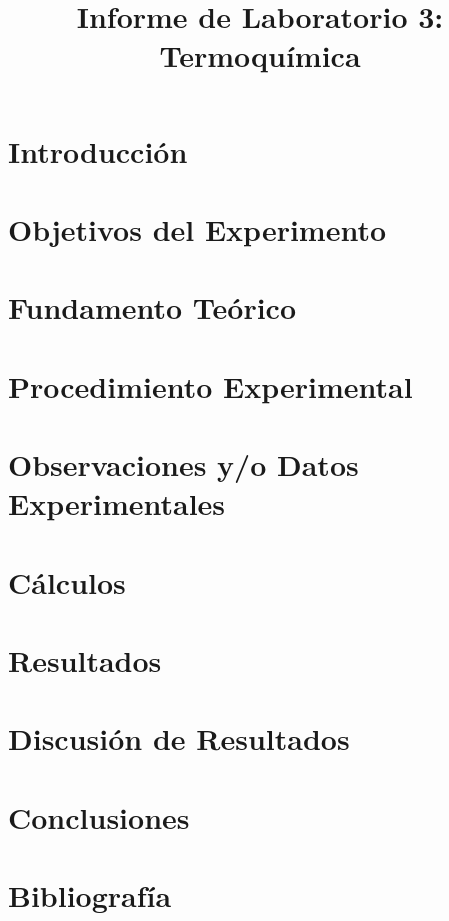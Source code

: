 \documentclass[1in,a4paper]{article}
\title{Informe de Laboratorio 3: Termoquímica}
\begin{document}

\pagestyle{fancy}
\fancyfoot{}
\fancyfoot[R]{\textit{\thepage}}
\tableofcontents
\newpage
\section{Introducción} %


\section{Objetivos del Experimento} %

\section{Fundamento Teórico} %

\section{Procedimiento Experimental} %

\section{Observaciones y/o Datos Experimentales} %

\section{Cálculos} %

\section{Resultados} %

\section{Discusión de Resultados} %

\section{Conclusiones} %

\section{Bibliografía} %
\renewcommand{\bibsection}{}

\newpage
\listoffigures
\listoftables
\end{document}
